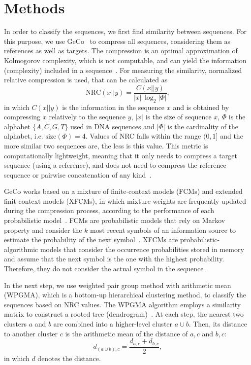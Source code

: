 \documentclass[extendedabs]{recpad2k}
\begin{document}
\section{Methods}
In order to classify the sequences, we first find similarity between sequences. For this purpose, we use GeCo~\cite{pratas2016efficient} to compress all sequences, considering them as references as well as targets. The compression is an optimal approximation of Kolmogorov complexity, which is not computable, and can yield the information (complexity) included in a sequence~\cite{kolmogorov1965three}. For measuring the similarity, normalized relative compression is used, that can be calculated as~\cite{pratas2018comparison}
\begin{equation}
   \mathrm{NRC} (x||y) = \frac{C (x||y)}{|x|\, \log_2 |\Phi|},
\end{equation}
in which $C (x||y)$ is the information in the sequence $x$ and is obtained by compressing $x$ relatively to the sequence $y$, $|x|$ is the size of sequence $x$, $\Phi$ is the alphabet $\{A, C, G, T\}$ used in DNA sequences and $|\Phi|$ is the cardinality of the alphabet, i.e. $ \mathrm{size}(\Phi) = 4 $. Values of NRC falls within the range $(0, 1]$ and the more similar two sequences are, the less is this value. This metric is computationally lightweight, meaning that it only needs to compress a target sequence (using a reference), and does not need to compress the reference sequence or pairwise concatenation of any kind~\cite{pratas2018comparison}.

GeCo works based on a mixture of finite-context models (FCMs) and extended finit-context models (XFCMs), in which mixture weights are frequently updated during the compression process, according to the performance of each probabilistic model~\cite{pratas2016efficient}. FCMs are probabilistic models that rely on Markov property and consider the $k$ most recent symbols of an information source to estimate the probability of the next symbol~\cite{hosseini2019ac}. XFCMs are probabilistic-algorithmic models that consider the occurrence probabilities stored in memory and assume that the next symbol is the one with the highest probability. Therefore, they do not consider the actual symbol in the sequence~\cite{pratas2017substitutional}.  

In the next step, we use weighted pair group method with arithmetic mean (WPGMA), which is a bottom-up hierarchical clustering method, to classify the sequences based on NRC values. The WPGMA algorithm employs a similarity matrix to construct a rooted tree (dendrogram)~\cite{sokal58a, clifford2011comparison}. At each step, the nearest two clusters $a$ and $b$ are combined into a higher-level cluster $a\cup b$. Then, its distance to another cluster $c$ is the arithmetic mean of the distance of $a, c$ and $b, c$:
\begin{equation}
   d_{(a\cup b), c} = \frac{d_{a, c} + d_{b, c}}{2},
\end{equation}
in which $d$ denotes the distance.
\end{document}
